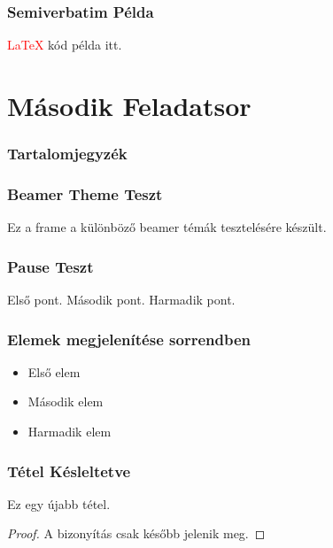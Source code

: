 \documentclass[12pt, aspectratio=169]{beamer}
\begin{document}
\begin{frame}[fragile]
    \frametitle{Semiverbatim Példa}
    \begin{semiverbatim}
        \textcolor{red}{\LaTeX} kód példa itt.
    \end{semiverbatim}
\end{frame}

\section{Második Feladatsor}

\begin{frame}
    \frametitle{Tartalomjegyzék}
\end{frame}

\begin{frame}
    \frametitle{Beamer Theme Teszt}
    Ez a frame a különböző beamer témák tesztelésére készült.
\end{frame}

\begin{frame}
    \frametitle{Pause Teszt}
    Első pont.
    \pause
    Második pont.
    \pause
    Harmadik pont.
\end{frame}

\begin{frame}
    \frametitle{Elemek megjelenítése sorrendben}
    \begin{itemize}
        \item<3> Első elem
        \item<2> Második elem
        \item<1> Harmadik elem
    \end{itemize}
\end{frame}

\begin{frame}
    \frametitle{Tétel Késleltetve}
    \begin{theorem}
        Ez egy újabb tétel.
    \end{theorem}
    \pause
    \begin{proof}
        A bizonyítás csak később jelenik meg.
    \end{proof}
\end{frame}
\end{document}
